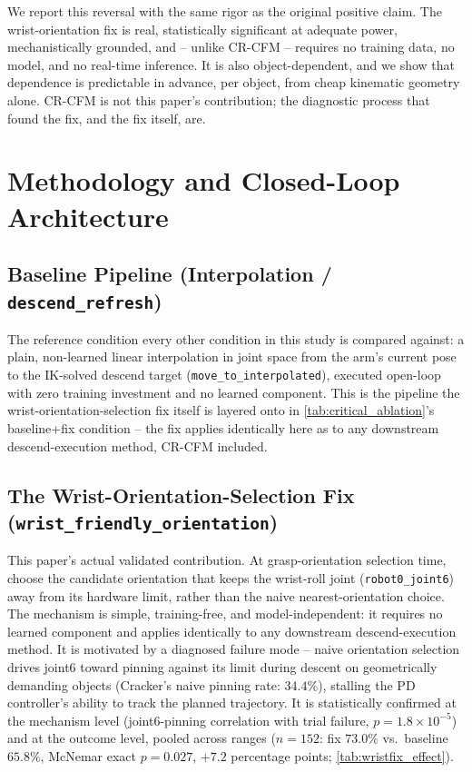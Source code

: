 \documentclass[]{interact}
\begin{document}
We report this reversal with the same rigor as the original positive claim. The wrist-orientation
fix is real, statistically significant at adequate power, mechanistically grounded, and -- unlike
CR-CFM -- requires no training data, no model, and no real-time inference. It is also
object-dependent, and we show that dependence is predictable in advance, per object, from cheap
kinematic geometry alone. CR-CFM is not this paper's contribution; the diagnostic process that found
the fix, and the fix itself, are.

\section{Methodology and Closed-Loop Architecture}

\subsection{Baseline Pipeline (Interpolation / \texttt{descend\_refresh})}
The reference condition every other condition in this study is compared against: a plain,
non-learned linear interpolation in joint space from the arm's current pose to the IK-solved
descend target (\texttt{move\_to\_interpolated}), executed open-loop with zero training
investment and no learned component. This is the pipeline the wrist-orientation-selection fix
itself is layered onto in \cref{tab:critical_ablation}'s baseline+fix condition -- the fix applies
identically here as to any downstream descend-execution method, CR-CFM included.

\subsection{The Wrist-Orientation-Selection Fix (\texttt{wrist\_friendly\_orientation})}
This paper's actual validated contribution. At grasp-orientation selection time, choose the
candidate orientation that keeps the wrist-roll joint (\texttt{robot0\_joint6}) away from its
hardware limit, rather than the naive nearest-orientation choice. The mechanism is simple,
training-free, and model-independent: it requires no learned component and applies identically to
any downstream descend-execution method. It is motivated by a diagnosed failure mode -- naive
orientation selection drives joint6 toward pinning against its limit during descent on
geometrically demanding objects (Cracker's naive pinning rate: $34.4\%$), stalling the PD
controller's ability to track the planned trajectory. It is statistically confirmed at the
mechanism level (joint6-pinning correlation with trial failure, $p=1.8\times10^{-5}$) and at the
outcome level, pooled across ranges ($n=152$: fix $73.0\%$ vs.\ baseline $65.8\%$, McNemar exact
$p=0.027$, $+7.2$ percentage points; \cref{tab:wristfix_effect}).
\end{document}
